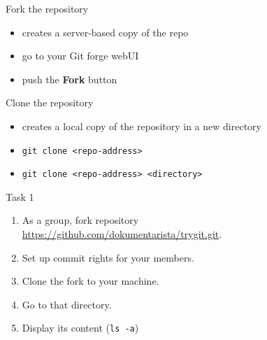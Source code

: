 \documentclass[14pt]{beamer}
\begin{document}
	\begin{frame}{Fork the repository}
	\begin{itemize}
		\item creates a server-based copy of the repo
		\item go to your Git forge webUI
		\item push the \textbf{Fork} button
	\end{itemize}
	\end{frame}


	\begin{frame}{Clone the repository}
	\begin{itemize}
		\item creates a local copy of the repository in a new directory
		\item \texttt{git clone <repo-address>}
		\item \texttt{git clone <repo-address> <directory>}
	\end{itemize}

	\end{frame}

	\begin{frame}{Task 1}
	\begin{enumerate}
		\item As a group, fork repository \\ {\small \url{https://github.com/dokumentarista/trygit.git}}.
		\item Set up commit rights for your members.
		\item Clone the fork to your machine.
		\item Go to that directory.
		\item Display its content (\texttt{ls -a})
	\end{enumerate}
	
	\end{frame}
\end{document}

